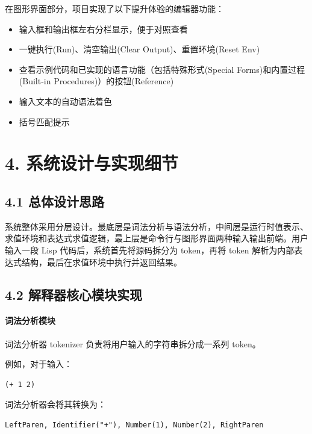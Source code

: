 \documentclass[12pt, a4paper]{ctexart}
\begin{document}
在图形界面部分，项目实现了以下提升体验的编辑器功能：

\begin{itemize}
\item 输入框和输出框左右分栏显示，便于对照查看
\item 一键执行(Run)、清空输出(Clear Output)、重置环境(Reset Env)
\item 查看示例代码和已实现的语言功能（包括特殊形式(Special Forms)和内置过程(Built-in Procedures)）的按钮(Reference)
\item 输入文本的自动语法着色
\item 括号匹配提示
\end{itemize}

\section*{4. 系统设计与实现细节}

\subsection*{4.1 总体设计思路}

系统整体采用分层设计。最底层是词法分析与语法分析，中间层是运行时值表示、求值环境和表达式求值逻辑，最上层是命令行与图形界面两种输入输出前端。用户输入一段 Lisp 代码后，系统首先将源码拆分为 token，再将 token 解析为内部表达式结构，最后在求值环境中执行并返回结果。

\subsection*{4.2 解释器核心模块实现}

\paragraph*{词法分析模块}


词法分析器 tokenizer 负责将用户输入的字符串拆分成一系列 token。

例如，对于输入：

\begin{verbatim}
(+ 1 2)
\end{verbatim}

词法分析器会将其转换为：

\begin{verbatim}
LeftParen, Identifier("+"), Number(1), Number(2), RightParen
\end{verbatim}
\end{document}
